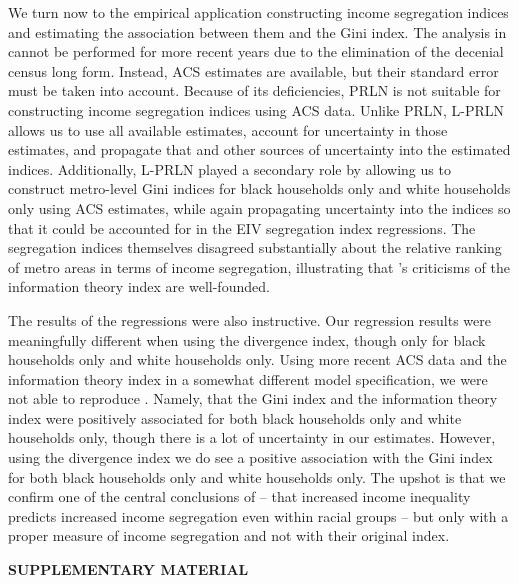 \documentclass[12pt]{article}
\begin{document}
We turn now to the empirical application constructing income segregation indices and estimating the association between them and the Gini index. The analysis in \citet{reardon2011income} cannot be performed for more recent years due to the elimination of the decenial census long form. Instead, ACS estimates are available, but their standard error must be taken into account. Because of its deficiencies, PRLN is not suitable for constructing income segregation indices using ACS data. Unlike PRLN, L-PRLN allows us to use all available estimates, account for uncertainty in those estimates, and propagate that and other sources of uncertainty into the estimated indices. Additionally, L-PRLN played a secondary role by allowing us to construct metro-level Gini indices for black households only and white households only using ACS estimates, while again propagating uncertainty into the indices so that it could be accounted for in the EIV segregation index regressions. The segregation indices themselves disagreed substantially about the relative ranking of metro areas in terms of income segregation, illustrating that \citet{roberto2015divergence}'s criticisms of the information theory index are well-founded.

The results of the regressions were also instructive. Our regression results were meaningfully different when using the divergence index, though only for black households only and white households only. Using more recent ACS data and the information theory index in a somewhat different model specification, we were not able to reproduce \citet{reardon2011income}. Namely, that the Gini index and the information theory index were positively associated for both black households only and white households only, though there is a lot of uncertainty in our estimates. However, using the divergence index we do see a positive association with the Gini index for both black households only and white households only. The upshot is that we confirm one of the central conclusions of \citet{reardon2011income} -- that increased income inequality predicts increased income segregation even within racial groups -- but only with a proper measure of income segregation and not with their original index.


\begin{center}
{\large\bf SUPPLEMENTARY MATERIAL}
\end{center}
\end{document}
